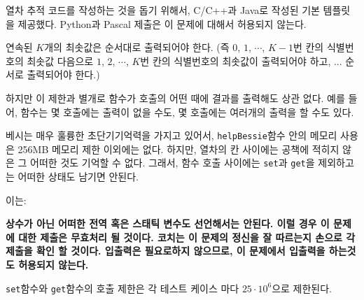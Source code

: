 \begin{problem}{열차 추적}
	코드를 작성하는 것을 돕기 위해서, C/C++과 Java로 작성된 기본 템플릿을 제공했다. Python과 Pascal 제출은 이 문제에 대해서 허용되지 않는다. 	

	연속된 $K$개의 최솟값은 순서대로 출력되어야 한다. (즉 $0$, $1$, $\cdots$, $K-1$번 칸의 식별번호의 최솟값 다음으로 $1$, $2$, $\cdots$, $K$번 칸의 식별번호의 최솟값이 출력되어야 하고, ... 순서로 출력되어야 한다.)
	
	하지만 이 제한과 별개로 함수가 호출의 어떤 때에 결과를 출력해도 상관 없다. 예를 들어, 함수는 몇 호출에는 출력이 없을 수도, 몇 호출에는 여러개의 출력을 할 수도 있다.
	
	베시는 매우 훌륭한 초단기기억력을 가지고 있어서, \texttt{helpBessie}함수 안의 메모리 사용은 256MB 메모리 제한 이외에는 없다. 하지만, 열차의 칸 사이에는 공책에 적히지 않은 그 어떠한 것도 기억할 수 없다. 그래서, 함수 호출 사이에는 \texttt{set}과 \texttt{get}을 제외하고는 어떠한 상태도 남기면 안된다. 
	
	이는:
	
	\textbf{상수가 아닌 어떠한 전역 혹은 스태틱 변수도 선언해서는 안된다. 이럴 경우 이 문제에 대한 제출은 무효처리 될 것이다. 코치는 이 문제의 정신을 잘 따르는지 손으로 각 제출을 확인 할 것이다. 입출력은 필요로하지 않으므로, 이 문제에서 입출력을 하는것도 허용되지 않는다.}
	
	\texttt{set}함수와 \texttt{get}함수의 호출 제한은 각 테스트 케이스 마다 $25 \cdot 10^6$으로 제한된다.

	
	\Examples
	
	\begin{example}
	\end{example}

	
	
\end{problem}

